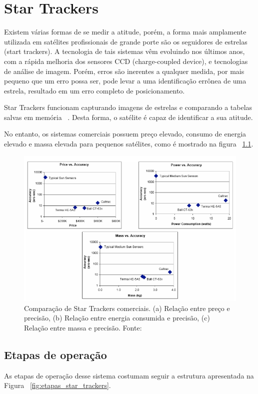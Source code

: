 \chapter{Star Trackers}

Existem várias formas de se medir a atitude, porém, a forma mais amplamente utilizada em satélites profissionais de grande porte são os seguidores de estrelas (start trackers). A tecnologia de tais sistemas vêm evoluindo nos últimos anos, com a rápida melhoria dos sensores CCD (charge-coupled device), e tecnologias de análise de imagem. Porém,  erros são  inerentes a qualquer medida, por mais pequeno que um erro possa ser, pode levar a uma identificação errônea de uma estrela, resultado em um erro completo de posicionamento.

Star Trackers funcionam capturando imagens de estrelas e comparando a tabelas salvas em memória ~\cite[]{Diaz}. Desta forma, o satélite é capaz de identificar a sua atitude.

No entanto, os sistemas comerciais possuem preço elevado, consumo de energia elevado e massa elevada para pequenos satélites, como é mostrado na figura ~\ref{fig:Comp_star_trackers_comerciais}.

\begin{figure}[!h]
	\centering
	\includegraphics[width=.7\columnwidth]{images/comp_star_trackers.png}
	\caption{Comparação de Star Trackers comerciais. (a) Relação entre preço e precisão, (b) Relação entre energia consumida e precisão, (c) Relação entre massa e precisão. Fonte: ~\cite[]{Diaz}}
	\label{fig:Comp_star_trackers_comerciais}
\end{figure}

\section{Etapas de operação}


As etapas de operação desse sistema costumam seguir a estrutura apresentada na Figura ~\ref{fig:etapas_star_trackers}.


